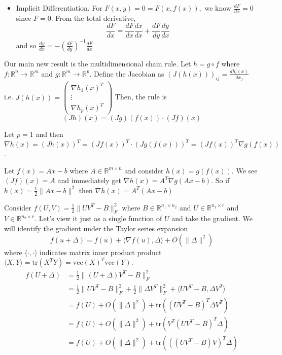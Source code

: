 \documentclass[english, 11pt]{article}
\begin{document}
\begin{enumerate}
\begin{itemize}
\item Implicit Differentiation. For $F(x,y)=0 = F(x,f(x)),$ we know $\frac{dF}{dx}=0$ since $F=0$. From the total derivative,
\[
\frac{dF}{dx} = \frac{dF}{dx} \frac{dx}{dx} + \frac{dF}{dy} \frac{dy}{dx}
\]
and so $\frac{dy}{dx} = - \left( \frac{dF}{dy} \right)^{-1} \frac{dF}{dx}$
\end{itemize}
Our main new result is the multidimensional chain rule. Let $h = g \circ f$ where $f: \mathbb{R}^n \to \mathbb{R}^m$ and $g : \mathbb{R}^m \to \mathbb{R}^p$. Define the Jacobian as $(J (h(x)))_{ij} = \frac{d h_i(x)}{ d x_j}$ i.e.
$
J(h(x)) =  \begin{pmatrix} \nabla h_1(x)^T \\ \vdots \\ \nabla h_p(x) ^T \end{pmatrix}
$
Then, the rule is
\[
(J h)(x) = (Jg)(f(x)) \cdot (J f)(x)
\]

\begin{rem}
Let $p=1$ and then $\nabla h(x) = (J h(x)) ^T = (J f(x))^T \cdot (J g(f(x)))^T
= ( J f(x))^T \nabla g(f(x))$.
\end{rem}

\begin{exmp}
Let $f(x) = Ax-b$ where $A \in \mathbb{R}^{m \times n}$ and consider $h(x) = g(f(x))$. We see $(J f)(x) = A$ and immediately get $\nabla h(x) = A^T \nabla g(Ax-b)$. So if $h(x) = \frac{1}{2} \|Ax-b\|^2$ then $\nabla h(x) = A^T (Ax-b)$
\end{exmp}



\begin{exmp}
Consider $f(U,V)  = \frac{1}{2} \| UV^T  - B\|_F^2$ where $B \in \mathbb{R}^{n_1 \times n_2}$ and $U \in \mathbb{R}^{n_1 \times r}$ and $V \in \mathbb{R}^{n_2 \times r}$. Let's view it just as a single function of $U$ and take the gradient. We will identify the gradient under the Taylor series expansion
\[
f(u+\Delta) = f(u) + \langle \nabla f(u), \Delta \rangle + O(\| \Delta \|^2 ) 
\]
where $\langle \cdot, \cdot \rangle$ indicates matrix inner product product $\langle X, Y \rangle = \text{tr}(X^T Y) = \text{vec}(X)^T \text{vec}(Y)$.
\begin{align*}
f(U+\Delta) &= \frac{1}{2} \| (U + \Delta) V^T  - B\|_F^2 \\
&= \frac{1}{2} \| UV^T  - B\|_F^2 + \frac{1}{2} \| \Delta V^T \|_F^2 + \langle UV^T - B, \Delta V^T \rangle \\
&= f(U) + O(\| \Delta\|^2) + \text{tr}( (UV^T -B)^T \Delta V^T) \\
& = f(U) + O(\| \Delta\|^2) +  \text{tr}( V^T (UV^T -B)^T \Delta  ) \\
& = f(U) + O(\| \Delta\|^2) +  \text{tr}( ( (UV^T -B) V)^T \Delta  )
\end{align*}
\end{exmp}


\end{enumerate}
\end{document}
